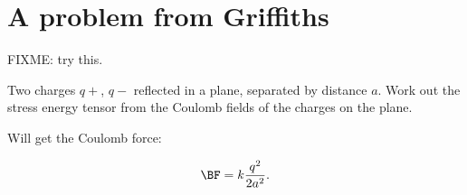 %
%

\section{A problem from Griffiths}

FIXME: try this.

Two charges $q+$, $q-$ reflected in a plane, separated by distance $a$.  Work out the stress energy tensor from the Coulomb fields of the charges on the plane.

Will get the Coulomb force:

\begin{equation}\label{eqn:relativisticElectrodynamicsT9:330}
\BF = k \frac{q^2}{2 a^2}.
\end{equation}

